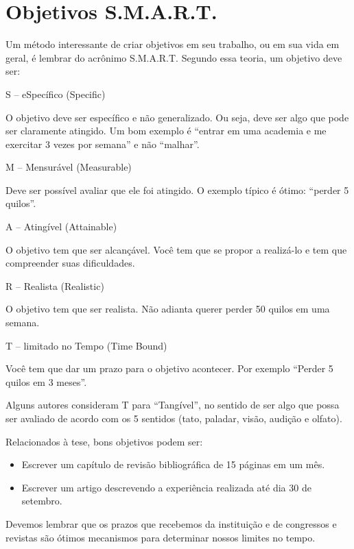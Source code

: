 \section{Objetivos S.M.A.R.T.}


Um método interessante de criar objetivos em seu trabalho, ou em sua vida em geral, é lembrar do acrônimo S.M.A.R.T. Segundo essa teoria, um objetivo deve ser:

\begin{outline}
\1	S – eSpecífico (Specific)


\2	O objetivo deve ser específico e não generalizado. Ou seja, deve ser algo que pode ser claramente atingido. Um bom exemplo é “entrar em uma academia e me exercitar 3 vezes por semana” e não “malhar”. 


\1	M – Mensurável (Measurable)


\2	Deve ser possível avaliar que ele foi atingido. O exemplo típico é ótimo: “perder 5 quilos”.


\1	A – Atingível (Attainable)


\2	O objetivo tem que ser alcançável. Você tem que se propor a realizá-lo e tem que compreender suas dificuldades.


\1	R – Realista (Realistic)


\2	O objetivo tem que ser realista. Não adianta querer perder 50 quilos em uma semana. 


\1	T – limitado no Tempo (Time Bound)


\2	Você tem que dar um prazo para o objetivo acontecer. Por exemplo “Perder 5 quilos em 3 meses”.


\2	Alguns autores consideram T para “Tangível”, no sentido de ser algo que possa ser avaliado de acordo com os 5 sentidos (tato, paladar, visão, audição e olfato). 
\end{outline}

Relacionados à tese, bons objetivos podem ser:

\begin{itemize}
	\item	Escrever um capítulo de revisão bibliográfica de 15 páginas em um mês.
	
	
	\item	Escrever um artigo descrevendo a experiência realizada até dia 30 de setembro.
	
\end{itemize}


Devemos lembrar que os prazos que recebemos da instituição e de congressos e revistas são ótimos mecanismos para determinar nossos limites no tempo.



